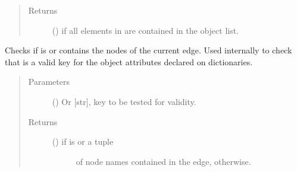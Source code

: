 \documentclass[letterpaper,10pt,english]{sphinxmanual}
\begin{document}
\begin{fulllineitems}
\begin{fulllineitems}
\begin{quote}
\begin{description}
\item[{Returns}] \leavevmode
() \textendash{}  if all elements in  are
contained in the object  list.

\end{description}\end{quote}

\end{fulllineitems}


\begin{fulllineitems}
\label{\detokenize{main:pypath.main.Direction.check_param}}
Checks if  is  or contains the nodes of
the current edge. Used internally to check that  is a valid
key for the object attributes declared on dictionaries.
\begin{quote}\begin{description}
\item[{Parameters}] \leavevmode
{} () \textendash{} Or {[}str{]}, key to be tested for validity.

\item[{Returns}] \leavevmode
\begin{description}
\item[{() \textendash{}  if  is  or a tuple}] \leavevmode
of node names contained in the edge,  otherwise.

\end{description}


\end{description}\end{quote}

\end{fulllineitems}



\end{fulllineitems}
\end{document}
